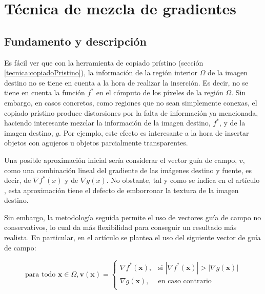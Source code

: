 \documentclass[11pt,twoside,titlepage,a4paper]{article}
\numberwithin{equation}{section} %
\theoremstyle{usual}
\begin{document}
\newpage

\section{Técnica de mezcla de gradientes} \label{tecnica:mezcladoDeGradiente}

\subsection{Fundamento y descripción}

Es fácil ver que con la herramienta de copiado prístino (sección \ref{tecnica:copiadoPristino}), la información de la región interior $\Omega$ de la imagen destino no se tiene en cuenta a la hora de realizar la inserción. Es decir, no se tiene en cuenta la función $f^*$ en el cómputo de los píxeles de la región $\Omega$. Sin embargo, en casos concretos, como regiones que no sean simplemente conexas, el copiado prístino produce distorsiones por la falta de información ya mencionada, haciendo interesante mezclar la información de la imagen destino, $f^*$, y de la imagen destino, $g$. Por ejemplo, este efecto es interesante a la hora de insertar objetos con agujeros u objetos parcialmente transparentes.

Una posible aproximación inicial sería considerar el vector guía de campo, $v$, como una combinación lineal del gradiente de las imágenes destino y fuente, es decir, de $\nabla f^*(x)$ y de $\nabla g(x)$. No obstante, tal y como se indica en el artículo \cite{poissonImageEditing}, esta aproximación tiene el defecto de emborronar la textura de la imagen destino.

Sin embargo, la metodología seguida permite el uso de vectores guía de campo no conservativos, lo cual da más flexibilidad para conseguir un resultado más realista. En particular, en el artículo se plantea el uso del siguiente vector de guía de campo:

\begin{equation}
    \text{para todo } \boldsymbol{x} \in \Omega, \boldsymbol{v(x)}=\left\{
                \begin{array}{ll}
                \nabla f^*(\boldsymbol{x}), & \text{si $|\nabla f^*(\boldsymbol{x})| > |\nabla g(\boldsymbol{x})|$}\\
                \nabla g(\boldsymbol{x}), & \text{en caso contrario}\\
                \end{array}
          \right.
\end{equation}
          
\end{document}
